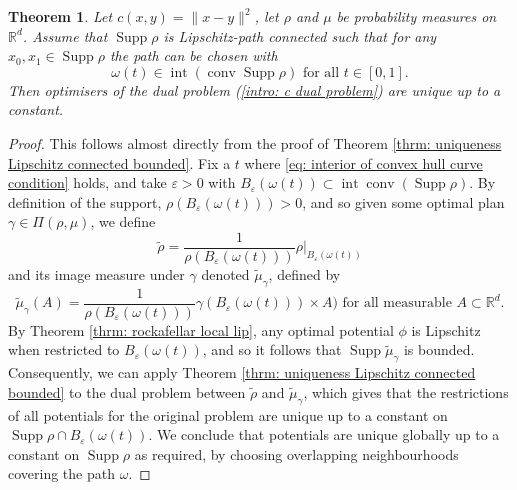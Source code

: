 \documentclass[11pt, oneside, titlepage]{book}
\theoremstyle{plain}
\newtheorem{theorem}{Theorem}[chapter]
\theoremstyle{definition}
\newcommand{\R}{\mathbb{R}}
\DeclareMathOperator{\Int}{int}
\DeclareMathOperator{\conv}{conv}
\DeclareMathOperator{\supp}{Supp}
\begin{document}
\begin{theorem}
\label{thrm: unbounded target uniqueness}
Let $c(x, y) = \|x-y\|^2$, let $\rho$ and $\mu$ be probability measures on $\R^d$. Assume that $\supp \rho$ is Lipschitz-path connected such that for any $x_0, x_1 \in \supp \rho$ the path can be chosen with
\begin{equation}
\label{eq: interior of convex hull curve condition}
    \omega(t) \in \Int (\conv \supp \rho) \text{ for all } t \in [0, 1].
\end{equation}
Then optimisers of the dual problem (\ref{intro: c dual problem}) are unique up to a constant.
\end{theorem}
\begin{proof}
    This follows almost directly from the proof of Theorem \ref{thrm: uniqueness Lipschitz connected bounded}. Fix a $t$ where \eqref{eq: interior of convex hull curve condition} holds,
    and take $\varepsilon>0$ with $B_\varepsilon(\omega(t)) \subset \Int \conv (\supp \rho)$. By definition of the support, $\rho(B_\varepsilon(\omega(t)))>0$, and so given some optimal plan $\gamma \in \Pi(\rho, \mu)$, we define
    \begin{equation*}
        \tilde\rho = \frac{1}{\rho(B_\varepsilon(\omega(t)))} \rho|_{B_\varepsilon(\omega(t))}
    \end{equation*}
    and its image measure under $\gamma$ denoted $\tilde\mu_\gamma$, defined by
    \begin{equation*}
        \tilde\mu_\gamma(A) = \frac{1}{\rho(B_\varepsilon(\omega(t)))} \gamma(B_\varepsilon(\omega(t))) \times A) \text{ for all measurable } A \subset \R^d.
    \end{equation*}
    By Theorem \ref{thrm: rockafellar local lip}, any optimal potential $\phi$ is Lipschitz when restricted to $B_\varepsilon(\omega(t))$, and so it follows that $\supp \tilde\mu_\gamma$ is bounded. Consequently, we can apply Theorem \ref{thrm: uniqueness Lipschitz connected bounded} to the dual problem between $\tilde\rho$ and $\tilde\mu_\gamma$, which gives that the restrictions of all potentials for the original problem are unique up to a constant on $\supp \rho \cap B_\varepsilon(\omega(t))$. We conclude that potentials are unique globally up to a constant on $\supp \rho$ as required, by choosing overlapping neighbourhoods covering the path $\omega$.
\end{proof}
\end{document}
